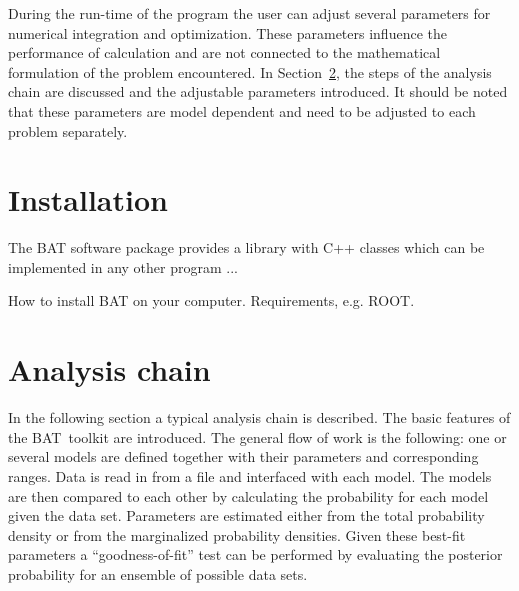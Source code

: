\documentclass[11pt, a4paper]{article}
\newcommand{\BAT}{{\sc BAT}}
\begin{document}
\noindent 
During the run-time of the program the user can adjust several
parameters for numerical integration and optimization. These
parameters influence the performance of calculation and are not
connected to the mathematical formulation of the problem
encountered. In Section~\ref{section:analysis}, the steps of the
analysis chain are discussed and the adjustable parameters
introduced. It should be noted that these parameters are model
dependent and need to be adjusted to each problem separately. 


\section{Installation} 

The BAT software package provides a library with C++ classes which can
be implemented in any other program ...

How to install BAT on your computer. Requirements, e.g. ROOT.


\section{Analysis chain}
\label{section:analysis}

In the following section a typical analysis chain is described. The
basic features of the \BAT\ toolkit are introduced. The general flow
of work is the following: one or several models are defined together
with their parameters and corresponding ranges. Data is read in from a
file and interfaced with each model. The models are then compared to
each other by calculating the probability for each model given the
data set. Parameters are estimated either from the total probability
density or from the marginalized probability densities. Given these
best-fit parameters a ``goodness-of-fit'' test can be performed by
evaluating the posterior probability for an ensemble of possible data
sets. \\
\end{document}
